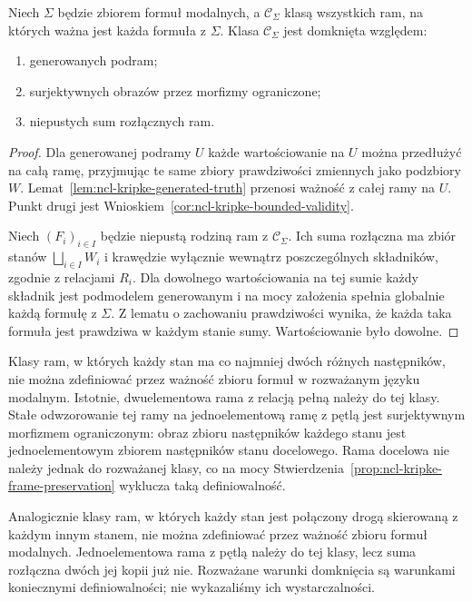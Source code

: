 \begin{stwierdzenie}
\label{prop:ncl-kripke-frame-preservation}
Niech $\Sigma$ będzie zbiorem formuł modalnych,
a $\mathcal C_\Sigma$ klasą wszystkich ram,
na których ważna jest każda formuła z $\Sigma$.
Klasa $\mathcal C_\Sigma$ jest domknięta względem:
\begin{enumerate}
 \item generowanych podram;
 \item surjektywnych obrazów przez morfizmy ograniczone;
 \item niepustych sum rozłącznych ram.
\end{enumerate}
\end{stwierdzenie}
\begin{proof}
Dla generowanej podramy $U$ każde
wartościowanie na $U$ można przedłużyć
na całą ramę, przyjmując te same zbiory
prawdziwości zmiennych jako podzbiory $W$.
Lemat~\ref{lem:ncl-kripke-generated-truth}
przenosi ważność z całej ramy na $U$.
Punkt drugi jest
Wnioskiem~\ref{cor:ncl-kripke-bounded-validity}.

Niech $(F_i)_{i\in I}$ będzie niepustą
rodziną ram z $\mathcal C_\Sigma$.
Ich suma rozłączna ma zbiór stanów
$\bigsqcup_{i\in I}W_i$ i krawędzie wyłącznie
wewnątrz poszczególnych składników,
zgodnie z relacjami $R_i$.
Dla dowolnego wartościowania na tej sumie
każdy składnik jest podmodelem generowanym
i na mocy założenia spełnia globalnie każdą
formułę z $\Sigma$. Z lematu o zachowaniu
prawdziwości wynika, że każda taka formuła
jest prawdziwa w każdym stanie sumy.
Wartościowanie było dowolne.
\end{proof}

\begin{przyklad}
\label{ex:ncl-kripke-frame-nondefinability}
Klasy ram, w których każdy stan ma co najmniej
dwóch różnych następników, nie można
zdefiniować przez ważność zbioru formuł
w rozważanym języku modalnym.
Istotnie, dwuelementowa rama z relacją pełną
należy do tej klasy. Stałe odwzorowanie
tej ramy na jednoelementową ramę z pętlą
jest surjektywnym morfizmem ograniczonym:
obraz zbioru następników każdego stanu
jest jednoelementowym zbiorem następników
stanu docelowego. Rama docelowa nie należy
jednak do rozważanej klasy, co na mocy
Stwierdzenia~\ref{prop:ncl-kripke-frame-preservation}
wyklucza taką definiowalność.

Analogicznie klasy ram, w których każdy stan
jest połączony drogą skierowaną z każdym innym stanem,
nie można zdefiniować przez ważność zbioru
formuł modalnych. Jednoelementowa rama
z pętlą należy do tej klasy, lecz suma
rozłączna dwóch jej kopii już nie.
Rozważane warunki domknięcia są warunkami
koniecznymi definiowalności; nie wykazaliśmy
ich wystarczalności.
\end{przyklad}

